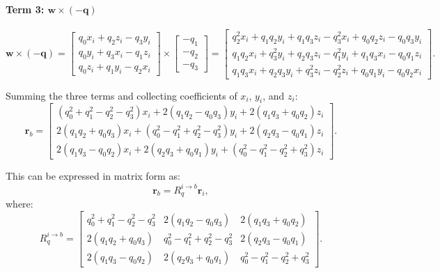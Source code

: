 \paragraph{Term 3: $\bm{w} \times (-\bm{q})$}
\begin{equation}
\bm{w} \times (-\bm{q}) =
\begin{bmatrix}
q_0 x_i + q_2 z_i - q_3 y_i \\
q_0 y_i + q_3 x_i - q_1 z_i \\
q_0 z_i + q_1 y_i - q_2 x_i
\end{bmatrix}
\times
\begin{bmatrix}
-q_1 \\ -q_2 \\ -q_3
\end{bmatrix}
=
\begin{bmatrix}
q_2^2 x_i + q_1 q_2 y_i + q_1 q_3 z_i - q_3^2 x_i + q_0 q_2 z_i - q_0 q_3 y_i \\
q_1 q_2 x_i + q_3^2 y_i + q_2 q_3 z_i - q_1^2 y_i + q_1 q_3 x_i - q_0 q_1 z_i \\
q_1 q_3 x_i + q_2 q_3 y_i + q_3^2 z_i - q_2^2 z_i + q_0 q_1 y_i - q_0 q_2 x_i
\end{bmatrix}.
\end{equation}


Summing the three terms and collecting coefficients of $x_i$, $y_i$, and $z_i$:
\begin{equation}
\bm{r}_b = 
\begin{bmatrix}
(q_0^2 + q_1^2 - q_2^2 - q_3^2)x_i + 2(q_1 q_2 - q_0 q_3)y_i + 2(q_1 q_3 + q_0 q_2)z_i \\
2(q_1 q_2 + q_0 q_3)x_i + (q_0^2 - q_1^2 + q_2^2 - q_3^2)y_i + 2(q_2 q_3 - q_0 q_1)z_i \\
2(q_1 q_3 - q_0 q_2)x_i + 2(q_2 q_3 + q_0 q_1)y_i + (q_0^2 - q_1^2 - q_2^2 + q_3^2)z_i
\end{bmatrix}.
\end{equation}

This can be expressed in matrix form as:
\begin{equation}
\bm{r}_b = R_q^{i \to b} \bm{r}_i,
\label{eqn:rotation_matrix_form}
\end{equation}
where:
\begin{equation}
R_q^{i \to b} =
\begin{bmatrix}
q_0^2 + q_1^2 - q_2^2 - q_3^2 & 2(q_1 q_2 - q_0 q_3) & 2(q_1 q_3 + q_0 q_2) \\
2(q_1 q_2 + q_0 q_3) & q_0^2 - q_1^2 + q_2^2 - q_3^2 & 2(q_2 q_3 - q_0 q_1) \\
2(q_1 q_3 - q_0 q_2) & 2(q_2 q_3 + q_0 q_1) & q_0^2 - q_1^2 - q_2^2 + q_3^2
\end{bmatrix}.
\label{eqn:rotation_matrix_general}
\end{equation}

